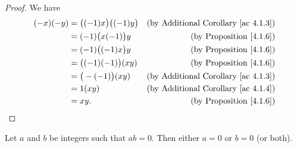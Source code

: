 \begin{proof}
    We have
    \begin{align*}
        (-x)(-y) & = \big((-1)x\big) \big((-1)y\big) & \text{(by Additional Corollary \ref{ac 4.1.3})} \\
                 & = (-1)\big(x(-1)\big)y            & \text{(by Proposition \ref{4.1.6})}             \\
                 & = (-1)\big((-1)x\big)y            & \text{(by Proposition \ref{4.1.6})}             \\
                 & = \big((-1)(-1)\big)(xy)          & \text{(by Proposition \ref{4.1.6})}             \\
                 & = \big(-(-1)\big)(xy)             & \text{(by Additional Corollary \ref{ac 4.1.3})} \\
                 & = 1(xy)                           & \text{(by Additional Corollary \ref{ac 4.1.4})} \\
                 & = xy.                             & \text{(by Proposition \ref{4.1.6})}
    \end{align*}
\end{proof}

\begin{proposition}\label{4.1.8}
    Let \(a\) and \(b\) be integers such that \(ab = 0\).
    Then either \(a = 0\) or \(b = 0\) (or both).
\end{proposition}

